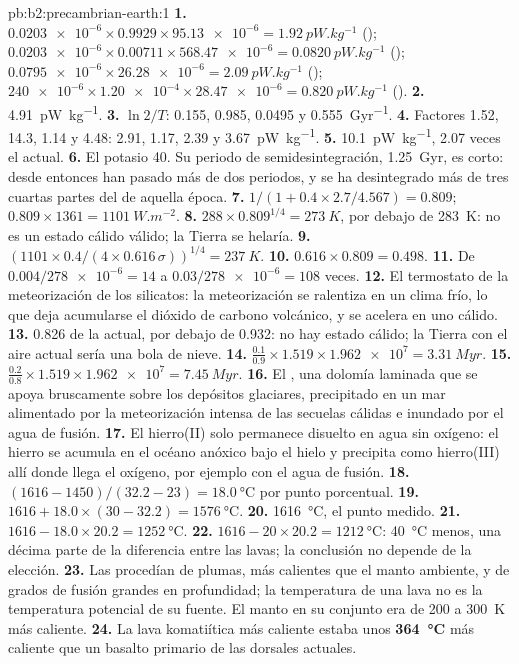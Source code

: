 \begin{solution}{pb:b2:precambrian-earth:1}
\textbf{1.} $\num{0.0203e-6}\times0.9929\times\num{95.13e-6} = \qty{1.92}{pW.kg^{-1}}$
(); $\num{0.0203e-6}\times0.00711\times\num{568.47e-6} = \qty{0.0820}{pW.kg^{-1}}$
(); $\num{0.0795e-6}\times\num{26.28e-6} = \qty{2.09}{pW.kg^{-1}}$ ();
$\num{240e-6}\times\num{1.20e-4}\times\num{28.47e-6} = \qty{0.820}{pW.kg^{-1}}$ ().
\textbf{2.} \qty{4.91}{pW.kg^{-1}}.
\textbf{3.} $\ln2/T$: 0.155, 0.985, 0.0495 y \qty{0.555}{Gyr^{-1}}.
\textbf{4.} Factores 1.52, 14.3, 1.14 y 4.48: 2.91, 1.17, 2.39 y \qty{3.67}{pW.kg^{-1}}.
\textbf{5.} \qty{10.1}{pW.kg^{-1}}, 2.07 veces el actual.
\textbf{6.} El potasio 40. Su periodo de semidesintegración, \qty{1.25}{Gyr}, es corto: desde entonces han pasado más de dos periodos,
y se ha desintegrado más de tres cuartas partes del  de aquella época.
\textbf{7.} $1/(1 + 0.4\times2.7/4.567) = 0.809$; $0.809\times1361 = \qty{1101}{W.m^{-2}}$.
\textbf{8.} $288\times0.809^{1/4} = \qty{273}{K}$, por debajo de \qty{283}{K}: no es un estado cálido válido;
la Tierra se helaría.
\textbf{9.} $(1101\times0.4/(4\times0.616\,\sigma))^{1/4} = \qty{237}{K}$.
\textbf{10.} $0.616\times0.809 = 0.498$.
\textbf{11.} De $0.004/\num{278e-6} = 14$ a $0.03/\num{278e-6} = 108$ veces.
\textbf{12.} El termostato de la meteorización de los silicatos: la meteorización se ralentiza en un clima frío, lo que deja
acumularse el dióxido de carbono volcánico, y se acelera en uno cálido.
\textbf{13.} 0.826 de la actual, por debajo de 0.932: no hay estado cálido; la Tierra con el aire actual sería una
bola de nieve.
\textbf{14.} $\frac{0.1}{0.9}\times1.519\times\num{1.962e7} = \qty{3.31}{Myr}$.
\textbf{15.} $\frac{0.2}{0.8}\times1.519\times\num{1.962e7} = \qty{7.45}{Myr}$.
\textbf{16.} El , una dolomía laminada que se apoya bruscamente sobre los depósitos glaciares,
precipitado en un mar alimentado por la meteorización intensa de las secuelas cálidas e inundado por el
agua de fusión.
\textbf{17.} El hierro(II) solo permanece disuelto en agua sin oxígeno: el hierro se acumula en el
océano anóxico bajo el hielo y precipita como hierro(III) allí donde llega el oxígeno, por ejemplo con el
agua de fusión.
\textbf{18.} $(1616 - 1450)/(32.2 - 23) = \qty{18.0}{\celsius}$ por punto porcentual.
\textbf{19.} $1616 + 18.0\times(30 - 32.2) = \qty{1576}{\celsius}$.
\textbf{20.} \qty{1616}{\celsius}, el punto medido.
\textbf{21.} $1616 - 18.0\times20.2 = \qty{1252}{\celsius}$.
\textbf{22.} $1616 - 20\times20.2 = \qty{1212}{\celsius}$: \qty{40}{\celsius} menos, una décima parte de
la diferencia entre las lavas; la conclusión no depende de la elección.
\textbf{23.} Las  procedían de plumas, más calientes que el manto ambiente, y de grados de fusión
grandes en profundidad; la temperatura de una lava no es la temperatura potencial de su fuente. El
manto en su conjunto era de 200 a \qty{300}{K} más caliente.
\textbf{24.} La lava komatiítica más caliente estaba unos \textbf{\qty{364}{\celsius}} más caliente que un
basalto primario de las dorsales actuales.
\end{solution}
